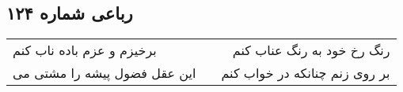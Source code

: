 \begin{center}
\section*{رباعی شماره ۱۲۴}
\label{sec:sh124}
\begin{longtable}{l p{0.5cm} r}
برخیزم و عزم باده ناب کنم
&&
رنگ رخ خود به رنگ عناب کنم
\\
این عقل فضول پیشه را مشتی می
&&
بر روی زنم چنانکه در خواب کنم
\\
\end{longtable}
\end{center}
